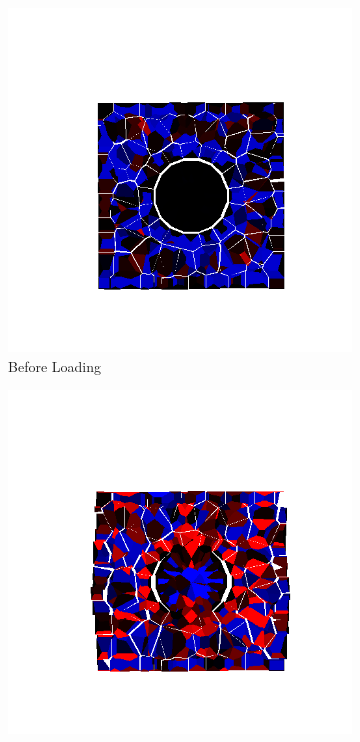 \begin{figure}[ht!]
\centering

    \begin{subfigure}{.33\textwidth}
      \centering
      \includegraphics[width=1.0\linewidth]{Files/Small_DEF/IS2/DEP5-STEP(020).png}
      \caption{Before Loading}
    \end{subfigure}%
    \begin{subfigure}{.33\textwidth}
      \centering
      \includegraphics[width=1.0\linewidth]{Files/Small_DEF/IS2/DEP5-STEP(040).png}

\end{subfigure}
\end{figure}
